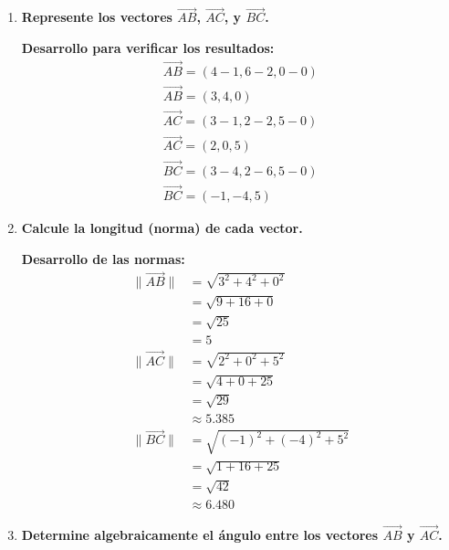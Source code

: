 \documentclass{article}
\begin{document}
\begin{enumerate}[label=\textbf{\arabic*.}, itemsep=1em, leftmargin=2em]
    \item \textcolor{vectorcolor}{\textbf{Represente los vectores $\overrightarrow{AB}$, $\overrightarrow{AC}$, y $\overrightarrow{BC}$.}}

    \begin{center}
    \colorbox{blue!5}{\begin{minipage}{0.9\textwidth}
    \vspace{0.3cm}
    \textbf{Desarrollo para verificar los resultados:}
    \begin{gather*}
        \overrightarrow{AB} = (4-1,  6-2, 0-0) \\
        \overrightarrow{AB} = \boxed{(3, 4, 0)} \\[0.5em]
        \overrightarrow{AC} = (3-1,  2-2,  5-0) \\
        \overrightarrow{AC} = \boxed{(2, 0, 5)} \\[0.5em]
        \overrightarrow{BC} = (3-4,2-6,5-0) \\
        \overrightarrow{BC} = \boxed{(-1, -4, 5)}
    \end{gather*}
    \vspace{0.2cm}
    \end{minipage}}
    \end{center}
    \item \textcolor{vectorcolor}{\textbf{Calcule la longitud (norma) de cada vector.}}
    
    \begin{center}
    \colorbox{green!5}{\begin{minipage}{0.9\textwidth}
    \vspace{0.3cm}
    \textbf{Desarrollo de las normas:}
    \begin{align*}
        \|\vec{AB}\| &= \sqrt{3^2 + 4^2 + 0^2} \\
        &= \sqrt{9 + 16 + 0} \\
        &= \sqrt{25} \\
        &= \boxed{5} \\[0.8em]
        \|\vec{AC}\| &= \sqrt{2^2 + 0^2 + 5^2} \\
        &= \sqrt{4 + 0 + 25} \\
        &= \sqrt{29} \\
        &\approx \boxed{5.385} \\[0.8em]
        \|\vec{BC}\| &= \sqrt{(-1)^2 + (-4)^2 + 5^2} \\
        &= \sqrt{1 + 16 + 25} \\
        &= \sqrt{42} \\
        &\approx \boxed{6.480}
    \end{align*}
    \vspace{0.2cm}
    \end{minipage}}
    \end{center}
    \item \textcolor{vectorcolor}{\textbf{Determine algebraicamente el ángulo entre los vectores $\overrightarrow{AB}$ y $\overrightarrow{AC}$.}}
    

\end{enumerate}
\end{document}
